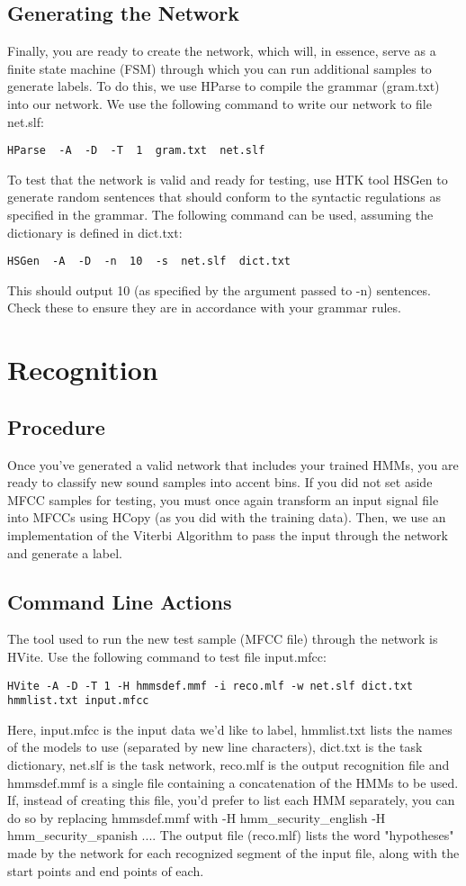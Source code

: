 \documentclass{wileySev}
\begin{document}
\section{Generating the Network}
Finally, you are ready to create the network, which will, in essence, serve as a finite state machine (FSM) through which you can run additional samples to generate labels. To do this, we use HParse to compile the grammar (gram.txt) into our network. We use the following command to write our network to file net.slf:
\begin{verbatim}
HParse  -A  -D  -T  1  gram.txt  net.slf
\end{verbatim}
To test that the network is valid and ready for testing, use HTK tool HSGen to generate random sentences that should conform to the syntactic regulations as specified in the grammar. The following command can be used, assuming the dictionary is defined in dict.txt:
\begin{verbatim}
HSGen  -A  -D  -n  10  -s  net.slf  dict.txt
\end{verbatim}
This should output 10 (as specified by the argument passed to -n) sentences. Check these to ensure they are in accordance with your grammar rules.

\chapter{Recognition}
\section{Procedure}
Once you've generated a valid network that includes your trained HMMs, you are ready to classify new sound samples into accent bins. If you did not set aside MFCC samples for testing, you must once again transform an input signal file into MFCCs using HCopy (as you did with the training data). Then, we use an implementation of the Viterbi Algorithm to pass the input through the network and generate a label.
\section{Command Line Actions}
The tool used to run the new test sample (MFCC file) through the network is HVite. Use the following command to test file input.mfcc:
\begin{verbatim}
HVite -A -D -T 1 -H hmmsdef.mmf -i reco.mlf -w net.slf dict.txt hmmlist.txt input.mfcc
\end{verbatim}
Here, input.mfcc is the input data we'd like to label, hmmlist.txt lists the names of the models to use (separated by new line characters), dict.txt is the task dictionary, net.slf is the task network, reco.mlf is the output recognition file and hmmsdef.mmf is a single file containing a concatenation of the HMMs to be used. If, instead of creating this file, you'd prefer to list each HMM separately, you can do so by replacing hmmsdef.mmf with -H hmm\_security\_english -H hmm\_security\_spanish ....
The output file (reco.mlf) lists the word "hypotheses" made by the network for each recognized segment of the input file, along with the start points and end points of each.
\end{document}
